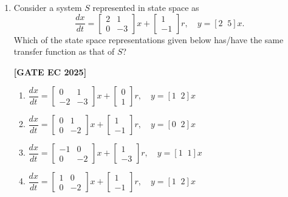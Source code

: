 \documentclass[12pt]{article}
\begin{document}
\begin{enumerate}[leftmargin=1.5em, label=\textbf{Q.\arabic*}., itemsep=2em]
\item Consider a system $S$ represented in state space as
\[
\frac{dx}{dt} = 
\begin{bmatrix}
2 & 1 \\
0 & -3
\end{bmatrix} x + 
\begin{bmatrix}
1 \\ -1
\end{bmatrix} r, 
\quad y = [2\;\; 5] x.
\]
Which of the state space representations given below has/have the same transfer function as that of $S$?

\noindent \textbf{[GATE EC 2025]}
\begin{multicols}{2}
\begin{enumerate}
    \item $\dfrac{dx}{dt} = 
    \begin{bmatrix}
    0 & 1 \\ -2 & -3
    \end{bmatrix} x + 
    \begin{bmatrix}
    0 \\ 1
    \end{bmatrix} r, \quad y = [1\;\; 2]x$
    \item $\dfrac{dx}{dt} = 
    \begin{bmatrix}
    0 & 1 \\ 0 & -2
    \end{bmatrix} x + 
    \begin{bmatrix}
    1 \\ -1
    \end{bmatrix} r, \quad y = [0\;\; 2]x$
    \item $\dfrac{dx}{dt} = 
    \begin{bmatrix}
    -1 & 0 \\ 0 & -2
    \end{bmatrix} x + 
    \begin{bmatrix}
    1 \\ -3
    \end{bmatrix} r, \quad y = [1\;\; 1]x$
    \item $\dfrac{dx}{dt} = 
    \begin{bmatrix}
    1 & 0 \\ 0 & -2
    \end{bmatrix} x + 
    \begin{bmatrix}
    1 \\ -1
    \end{bmatrix} r, \quad y = [1\;\; 2]x$
\end{enumerate}
\end{multicols}


\end{enumerate}
\end{document}
